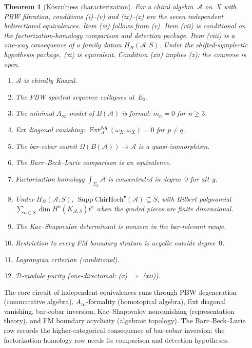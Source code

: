 \documentclass[11pt,reqno]{amsart}
\newtheorem{theorem}{Theorem}[section]
\theoremstyle{definition}
\theoremstyle{remark}
\providecommand{\cA}{\mathcal{A}}
\providecommand{\cD}{\mathcal{D}}
\numberwithin{equation}{section}
\begin{document}
\begin{theorem}[Koszulness characterization]
\label{thm:koszul-meta}
For a chiral algebra~$\cA$ on~$X$ with PBW filtration,
conditions \textup{(i)--(v)} and \textup{(ix)--(x)} are the
seven independent bidirectional equivalences. Item
\textup{(vi)} follows from \textup{(v)}. Item \textup{(vii)}
is conditional on the factorization-homology comparison and
detection package. Item \textup{(viii)} is a one-way consequence
of a family datum $H_H(\cA;S)$.
Under the shifted-symplectic hypothesis package, \textup{(xi)} is
equivalent. Condition \textup{(xii)} implies \textup{(x)}; the
converse is open.
\begin{enumerate}[label=\textup{(\roman*)}]
\item $\cA$ is chirally Koszul.
\item The PBW spectral sequence collapses at\/~$E_2$.
\item The minimal $A_\infty$-model of $B(\cA)$
 is formal: $m_n = 0$ for $n \ge 3$.
\item Ext diagonal vanishing:
 $\operatorname{Ext}^{p,q}_\cA(\omega_X, \omega_X) = 0$
 for $p \ne q$.
\item The bar-cobar counit
 $\Omega(B(\cA)) \to \cA$ is a quasi-isomorphism.
\item The Barr--Beck--Lurie comparison is an equivalence.
\item Factorization homology
 $\int_{\Sigma_g}\!\cA$ is concentrated in degree~$0$
 for all~$g$.
\item Under $H_H(\cA;S)$,
 $\operatorname{Supp}\mathrm{ChirHoch}^\bullet(\cA)\subseteq S$,
 with Hilbert polynomial
 $\sum_{n\in S}\dim H^n(K_{\cA,S})t^n$ when the graded pieces
 are finite dimensional.
\item The Kac--Shapovalov determinant is nonzero in the
 bar-relevant range.
\item Restriction to every FM boundary stratum is
 acyclic outside degree~$0$.
\item[{\upshape (xi)}] Lagrangian criterion \textup{(conditional)}.
\item[{\upshape (xii)}] $\cD$-module purity
 \textup{(one-directional: (x) $\Rightarrow$ (xii))}.
\end{enumerate}
\end{theorem}

The core circuit of independent equivalences runs through PBW
degeneration (commutative algebra), $A_\infty$-formality
(homotopical algebra), Ext diagonal vanishing, bar-cobar
inversion, Kac--Shapovalov nonvanishing (representation theory),
and FM boundary acyclicity (algebraic topology). The
Barr--Beck--Lurie row records the higher-categorical consequence
of bar-cobar inversion; the factorization-homology row needs its
comparison and detection hypotheses.
\end{document}
